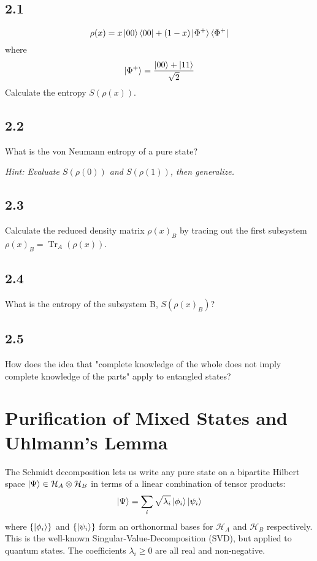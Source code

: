 \documentclass[11pt]{article}
\DeclareMathOperator{\Tr}{Tr} %
\begin{document}
\subsection{2.1}
\begin{equation*}
    \rho(x) = x \ket{00}\bra{00} + (1-x) \ket{\Phi^+}\bra{\Phi^+}
\end{equation*}
where
\begin{equation*}
    \ket{\Phi^+} = \frac{\ket{00} + \ket{11}}{\sqrt{2}}
\end{equation*}
Calculate the entropy $S(\rho(x))$.

\subsection{2.2}
What is the von Neumann entropy of a pure state?

\textit{Hint: Evaluate $S(\rho(0))$ and $S(\rho(1))$, then generalize.}

\subsection{2.3}
Calculate the reduced density matrix $\rho(x)_B$ by tracing out the first subsystem $\rho(x)_B = \Tr_A(\rho(x))$.

\subsection{2.4}
What is the entropy of the subsystem B, $S(\rho(x)_B)$?

\subsection{2.5}
How does the idea that "complete knowledge of the whole does not imply complete knowledge of the parts" apply to entangled states?

\section{Purification of Mixed States and Uhlmann's Lemma}
The Schmidt decomposition lets us write any pure state on a bipartite Hilbert space $\ket{\Psi} \in \mathcal{H}_A \otimes \mathcal{H}_B$ in terms of a linear combination of tensor products:
\begin{equation}
    \ket{\Psi} = \sum_i \sqrt{\lambda_i} \ket{\phi_i} \ket{\psi_i}
\end{equation}
where $\{\ket{\phi_i}\}$ and $\{\ket{\psi_i}\}$ form an orthonormal bases for $\mathcal{H}_A$ and $\mathcal{H}_B$ respectively. This is the well-known Singular-Value-Decomposition (SVD), but applied to quantum states. The coefficients $\lambda_i \ge 0$ are all real and non-negative.
\end{document}
